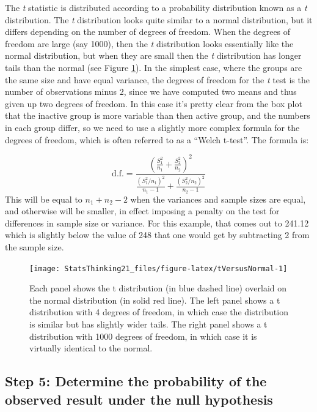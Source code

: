 \documentclass[12pt,]{book}
\theoremstyle{definition}
\theoremstyle{definition}
\theoremstyle{definition}
\theoremstyle{remark}
\begin{document}
The \emph{t} statistic is distributed according to a probability distribution known as a \emph{t} distribution. The \emph{t} distribution looks quite similar to a normal distribution, but it differs depending on the number of degrees of freedom. When the degrees of freedom are large (say 1000), then the \emph{t} distribution looks essentially like the normal distribution, but when they are small then the \emph{t} distribution has longer tails than the normal (see Figure \ref{fig:tVersusNormal}). In the simplest case, where the groups are the same size and have equal variance, the degrees of freedom for the \emph{t} test is the number of observations minus 2, since we have computed two means and thus given up two degrees of freedom. In this case it's pretty clear from the box plot that the inactive group is more variable than then active group, and the numbers in each group differ, so we need to use a slightly more complex formula for the degrees of freedom, which is often referred to as a ``Welch t-test''. The formula is:

\[
 \mathrm{d.f.} = \frac{\left(\frac{S_1^2}{n_1} + \frac{S_2^2}{n_2}\right)^2}{\frac{\left(S_1^2/n_1\right)^2}{n_1-1} + \frac{\left(S_2^2/n_2\right)^2}{n_2-1}}
\]
This will be equal to \(n_1 + n_2 - 2\) when the variances and sample sizes are equal, and otherwise will be smaller, in effect imposing a penalty on the test for differences in sample size or variance. For this example, that comes out to 241.12 which is slightly below the value of 248 that one would get by subtracting 2 from the sample size.

\begin{figure}
\texttt{[image: StatsThinking21\_files/figure-latex/tVersusNormal-1]} \caption{Each panel shows the t distribution (in blue dashed line) overlaid on the normal distribution (in solid red line).  The left panel shows a t distribution with 4 degrees of freedom, in which case the distribution is similar but has slightly wider tails.  The right panel shows a t distribution with 1000 degrees of freedom, in which case it is virtually identical to the normal.}\label{fig:tVersusNormal}
\end{figure}

\hypertarget{step-5-determine-the-probability-of-the-observed-result-under-the-null-hypothesis}{%
\subsection{Step 5: Determine the probability of the observed result under the null hypothesis}\label{step-5-determine-the-probability-of-the-observed-result-under-the-null-hypothesis}}
\end{document}
